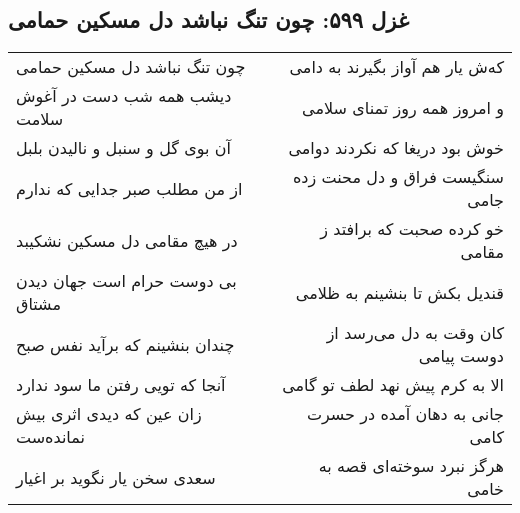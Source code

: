 \begin{center}
\section*{غزل ۵۹۹: چون تنگ نباشد دل مسکین حمامی}
\label{sec:599}
\begin{longtable}{l p{0.5cm} r}
چون تنگ نباشد دل مسکین حمامی
&&
که‌ش یار هم آواز بگیرند به دامی
\\
دیشب همه شب دست در آغوش سلامت
&&
و امروز همه روز تمنای سلامی
\\
آن بوی گل و سنبل و نالیدن بلبل
&&
خوش بود دریغا که نکردند دوامی
\\
از من مطلب صبر جدایی که ندارم
&&
سنگیست فراق و دل محنت زده جامی
\\
در هیچ مقامی دل مسکین نشکیبد
&&
خو کرده صحبت که برافتد ز مقامی
\\
بی دوست حرام است جهان دیدن مشتاق
&&
قندیل بکش تا بنشینم به ظلامی
\\
چندان بنشینم که برآید نفس صبح
&&
کان وقت به دل می‌رسد از دوست پیامی
\\
آنجا که تویی رفتن ما سود ندارد
&&
الا به کرم پیش نهد لطف تو گامی
\\
زان عین که دیدی اثری بیش نمانده‌ست
&&
جانی به دهان آمده در حسرت کامی
\\
سعدی سخن یار نگوید بر اغیار
&&
هرگز نبرد سوخته‌ای قصه به خامی
\\
\end{longtable}
\end{center}
